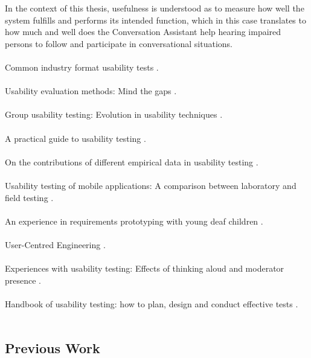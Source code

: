 \documentclass[english, 12pt, a4paper, pdftex, elec, utf8]{aaltothesis}
\begin{document}
In the context of this thesis, usefulness is understood as to measure how well the system fulfills and performs its intended function, which in this case translates to how much and well does the Conversation Assistant help hearing impaired persons to follow and participate in conversational situations. \\\\
Common industry format usability tests \cite{bevan1999common}. \\\\
Usability evaluation methods: Mind the gaps \cite{de2009usability}. \\\\
Group usability testing: Evolution in usability techniques \cite{downey2007group}. \\\\
A practical guide to usability testing \cite{dumas1999}. \\\\
On the contributions of different empirical data in usability testing \cite{ebling2000contributions}. \\\\
Usability testing of mobile applications: A comparison between laboratory and field testing \cite{kaikkonen2005}. \\\\
An experience in requirements prototyping with young deaf children \cite{korte2015experience}. \\\\
User-Centred Engineering \cite{richter2014user}. \\\\
Experiences with usability testing: Effects of thinking aloud and moderator presence \cite{riihiaho2015}. \\\\
Handbook of usability testing: how to plan, design and conduct effective tests \cite{rubin2008handbook}. \\\\

\subsection{Previous Work} \label{subsec:work}
\end{document}
